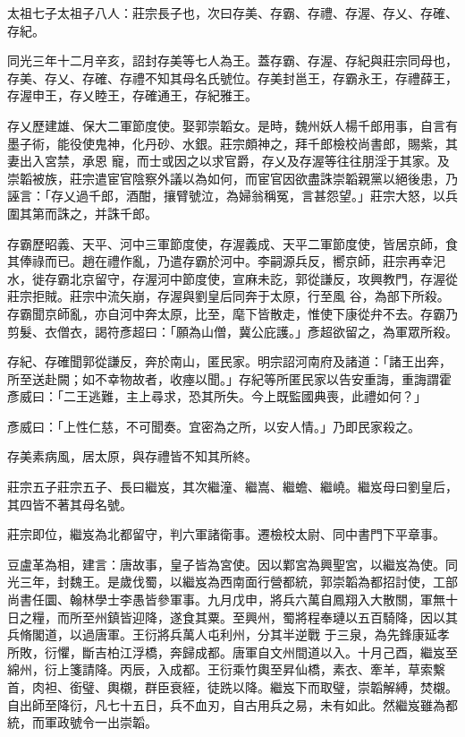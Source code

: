 \begin{pinyinscope}
 太祖七子太祖子八人：莊宗長子也，次曰存美、存霸、存禮、存渥、存乂、存確、存紀。



 同光三年十二月辛亥，詔封存美等七人為王。蓋存霸、存渥、存紀與莊宗同母也，存美、存乂、存確、存禮不知其母名氏號位。存美封邕王，存霸永王，存禮薛王，存渥申王，存乂睦王，存確通王，存紀雅王。



 存乂歷建雄、保大二軍節度使。娶郭崇韜女。是時，魏州妖人楊千郎用事，自言有墨子術，能役使鬼神，化丹砂、水銀。莊宗頗神之，拜千郎檢校尚書郎，賜紫，其妻出入宮禁，承恩
 寵，而士或因之以求官爵，存乂及存渥等往往朋淫于其家。及崇韜被族，莊宗遣宦官陰察外議以為如何，而宦官因欲盡誅崇韜親黨以絕後患，乃誣言：「存乂過千郎，酒酣，攘臂號泣，為婦翁稱冤，言甚怨望。」莊宗大怒，以兵圍其第而誅之，并誅千郎。



 存霸歷昭義、天平、河中三軍節度使，存渥義成、天平二軍節度使，皆居京師，食其俸祿而已。趙在禮作亂，乃遣存霸於河中。李嗣源兵反，嚮京師，莊宗再幸汜水，徙存霸北京留守，存渥河中節度使，宣麻未訖，郭從謙反，攻興教門，存渥從莊宗拒賊。莊宗中流矢崩，存渥與劉皇后同奔于太原，行至風
 谷，為部下所殺。存霸聞京師亂，亦自河中奔太原，比至，麾下皆散走，惟使下康從弁不去。存霸乃剪髮、衣僧衣，謁符彥超曰：「願為山僧，冀公庇護。」彥超欲留之，為軍眾所殺。



 存紀、存確聞郭從謙反，奔於南山，匿民家。明宗詔河南府及諸道：「諸王出奔，所至送赴闕；如不幸物故者，收瘞以聞。」存紀等所匿民家以告安重誨，重誨謂霍彥威曰：「二王逃難，主上尋求，恐其所失。今上既監國典喪，此禮如何？」



 彥威曰：「上性仁慈，不可聞奏。宜密為之所，以安人情。」乃即民家殺之。



 存美素病風，居太原，與存禮皆不知其所終。



 莊宗五子莊宗五子、長曰繼岌，其次繼潼、繼嵩、繼蟾、繼嶢。繼岌母曰劉皇后，其四皆不著其母名號。



 莊宗即位，繼岌為北都留守，判六軍諸衛事。遷檢校太尉、同中書門下平章事。



 豆盧革為相，建言：唐故事，皇子皆為宮使。因以鄴宮為興聖宮，以繼岌為使。同光三年，封魏王。是歲伐蜀，以繼岌為西南面行營都統，郭崇韜為都招討使，工部尚書任圜、翰林學士李愚皆參軍事。九月戊申，將兵六萬自鳳翔入大散關，軍無十日之糧，而所至州鎮皆迎降，遂食其粟。至興州，蜀將程奉璉以五百騎降，因以其兵脩閣道，以過唐軍。王衍將兵萬人屯利州，分其半逆戰
 于三泉，為先鋒康延孝所敗，衍懼，斷吉柏江浮橋，奔歸成都。唐軍自文州間道以入。十月己酉，繼岌至綿州，衍上箋請降。丙辰，入成都。王衍乘竹輿至昇仙橋，素衣、牽羊，草索繫首，肉袒、銜璧、輿櫬，群臣衰絰，徒跣以降。繼岌下而取璧，崇韜解縛，焚櫬。自出師至降衍，凡七十五日，兵不血刃，自古用兵之易，未有如此。然繼岌雖為都統，而軍政號令一出崇韜。




\end{pinyinscope}
